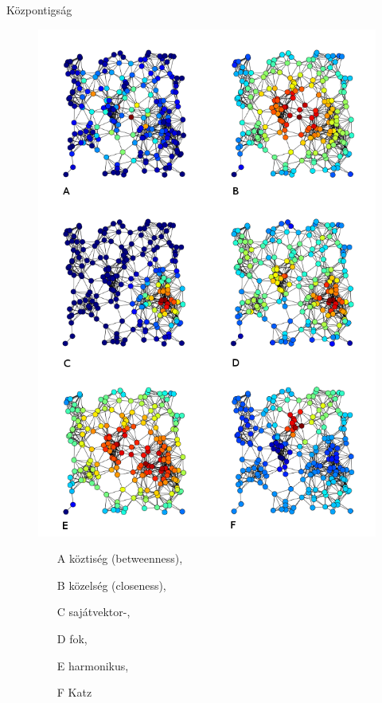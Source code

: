 \documentclass{beamer}
\newlength{\onecolwid}
\begin{document}
\begin{frame}[t]
\begin{columns}[t]
    \begin{column}{\onecolwid} %
      \begin{block}{Központigság}
        \begin{figure}
        \includegraphics{6_centrality_measures}
          \begin{itemize}
\item[A] köztiség (betweenness),
\item[B] közelség (closeness),
\item[C] sajátvektor-,
\item[D] fok,
\item[E] harmonikus,
\item[F] Katz
          \end{itemize}
        \end{figure}
      \end{block}



\end{column}
\end{columns}
\end{frame}
\end{document}
